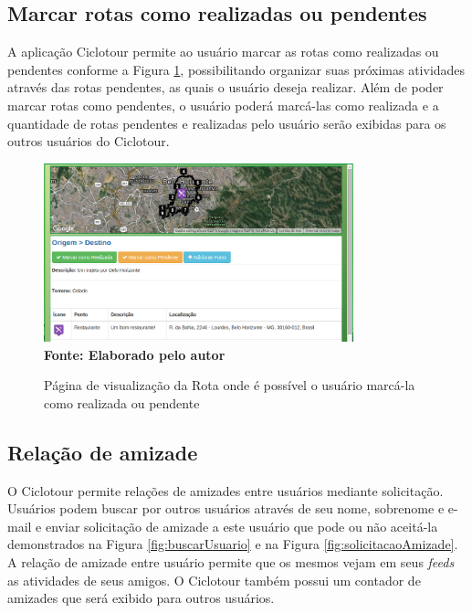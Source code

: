 \subsection{Marcar rotas como realizadas ou pendentes}
A aplicação Ciclotour permite ao usuário marcar as rotas como realizadas ou pendentes conforme a Figura \ref{fig:marcarRota}, possibilitando organizar
suas próximas atividades através das rotas pendentes, as quais o usuário deseja realizar. Além de poder marcar rotas como pendentes, o usuário poderá
marcá-las como realizada e a quantidade de rotas pendentes e realizadas pelo usuário serão exibidas para os outros usuários do Ciclotour.

\begin{figure}[!ht]
	\centering	
	\caption[\hspace{0.1cm} Marcar rotas como realizadas ou pendentes.]
	{Página de visualização da Rota onde é possível o usuário marcá-la como realizada ou pendente}
	  \vspace{-0.4cm}
	\includegraphics[width=0.8\textwidth]{figuras/marcarRota.png}
	 \vspace{0cm}
	\\\textbf{\footnotesize Fonte: Elaborado pelo autor}
	\label{fig:marcarRota}
\end{figure}

\subsection{Relação de amizade}

O Ciclotour permite relações de amizades entre usuários mediante solicitação. Usuários podem buscar por outros usuários através de seu nome, 
sobrenome e e-mail e enviar solicitação de amizade a este usuário que pode ou não aceitá-la demonstrados na Figura \ref{fig:buscarUsuario} e na 
Figura \ref{fig:solicitacaoAmizade}. A relação de amizade entre usuário permite que os mesmos vejam em seus \textit{feeds} as atividades de seus 
amigos. O Ciclotour também possui um contador de amizades que será exibido para outros usuários.

